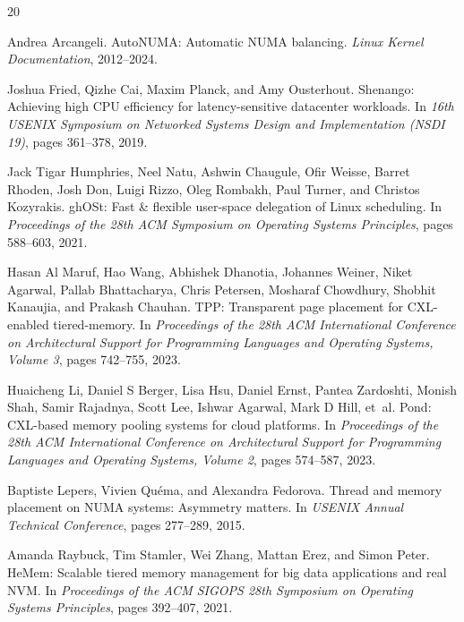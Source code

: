 \documentclass[11pt]{article}
\begin{document}
\begin{thebibliography}{20}

Andrea Arcangeli.
\newblock AutoNUMA: Automatic NUMA balancing.
\newblock \emph{Linux Kernel Documentation}, 2012--2024.

Joshua Fried, Qizhe Cai, Maxim Planck, and Amy Ousterhout.
\newblock Shenango: Achieving high CPU efficiency for latency-sensitive datacenter workloads.
\newblock In \emph{16th USENIX Symposium on Networked Systems Design and Implementation (NSDI 19)}, pages 361--378, 2019.

Jack Tigar Humphries, Neel Natu, Ashwin Chaugule, Ofir Weisse, Barret Rhoden, Josh Don, Luigi Rizzo, Oleg Rombakh, Paul Turner, and Christos Kozyrakis.
\newblock ghOSt: Fast \& flexible user-space delegation of Linux scheduling.
\newblock In \emph{Proceedings of the 28th ACM Symposium on Operating Systems Principles}, pages 588--603, 2021.

Hasan Al Maruf, Hao Wang, Abhishek Dhanotia, Johannes Weiner, Niket Agarwal, Pallab Bhattacharya, Chris Petersen, Mosharaf Chowdhury, Shobhit Kanaujia, and Prakash Chauhan.
\newblock TPP: Transparent page placement for CXL-enabled tiered-memory.
\newblock In \emph{Proceedings of the 28th ACM International Conference on Architectural Support for Programming Languages and Operating Systems, Volume 3}, pages 742--755, 2023.

Huaicheng Li, Daniel S Berger, Lisa Hsu, Daniel Ernst, Pantea Zardoshti, Monish Shah, Samir Rajadnya, Scott Lee, Ishwar Agarwal, Mark D Hill, et~al.
\newblock Pond: CXL-based memory pooling systems for cloud platforms.
\newblock In \emph{Proceedings of the 28th ACM International Conference on Architectural Support for Programming Languages and Operating Systems, Volume 2}, pages 574--587, 2023.

Baptiste Lepers, Vivien Qu\'ema, and Alexandra Fedorova.
\newblock Thread and memory placement on NUMA systems: Asymmetry matters.
\newblock In \emph{USENIX Annual Technical Conference}, pages 277--289, 2015.

Amanda Raybuck, Tim Stamler, Wei Zhang, Mattan Erez, and Simon Peter.
\newblock HeMem: Scalable tiered memory management for big data applications and real NVM.
\newblock In \emph{Proceedings of the ACM SIGOPS 28th Symposium on Operating Systems Principles}, pages 392--407, 2021.


\end{thebibliography}
\end{document}
